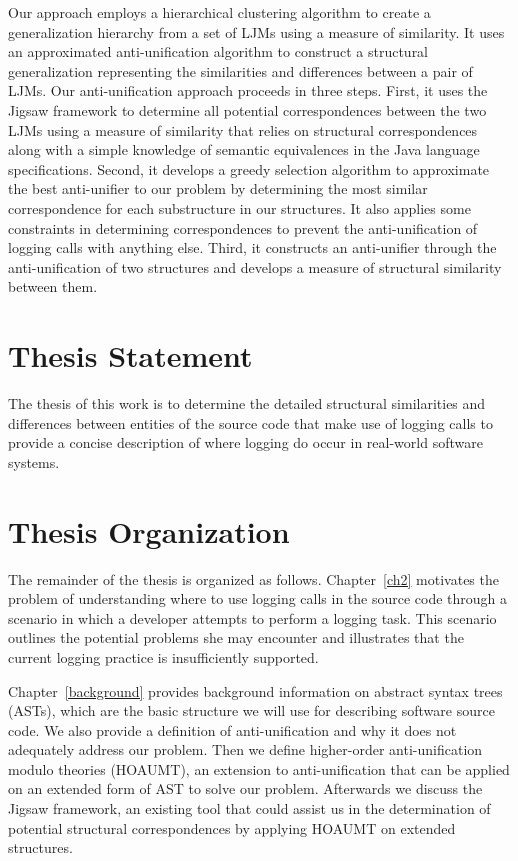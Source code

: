 Our approach employs a hierarchical clustering algorithm to create a generalization hierarchy from a set of LJMs using a measure of similarity. It uses an approximated anti-unification algorithm to construct a structural generalization representing the similarities and differences between a pair of LJMs. Our anti-unification approach proceeds in three steps. First, it uses the Jigsaw framework \cite{cottrell2008semi} to determine all potential correspondences between the two LJMs using a measure of similarity that relies on structural correspondences along with a simple knowledge of semantic equivalences in the Java language specifications. Second, it develops a greedy selection algorithm to approximate the best anti-unifier to our problem by determining the most similar correspondence for each substructure in our structures. 
It also applies some constraints in determining correspondences to prevent the anti-unification of logging calls with anything else. Third, it constructs an anti-unifier through the anti-unification of two structures and develops a measure of structural similarity between them.

\section{Thesis Statement} \label{intro-stmt}
The thesis of this work is to determine the detailed structural similarities and differences between entities of the source code that make use of logging calls to provide a concise description of where logging do occur in real-world software systems.

\section{Thesis Organization} \label{intro-org}
The remainder of the thesis is organized as follows. Chapter~\ref{ch2} motivates the problem of understanding where to use logging calls in the source code through a scenario in which a developer attempts to perform a logging task. This scenario outlines the potential problems she may encounter and illustrates that the current logging practice is insufficiently supported.

Chapter~\ref{background} provides background information on abstract syntax trees (ASTs), which are the basic structure we will use for describing software source code. We also provide a definition of anti-unification and why it does not adequately address our problem. Then we define higher-order anti-unification modulo theories (HOAUMT), an extension to anti-unification that can be applied on an extended form of AST to solve our problem. Afterwards we discuss the Jigsaw framework, an existing tool that could assist us in the determination of potential structural correspondences by applying HOAUMT on extended structures.

